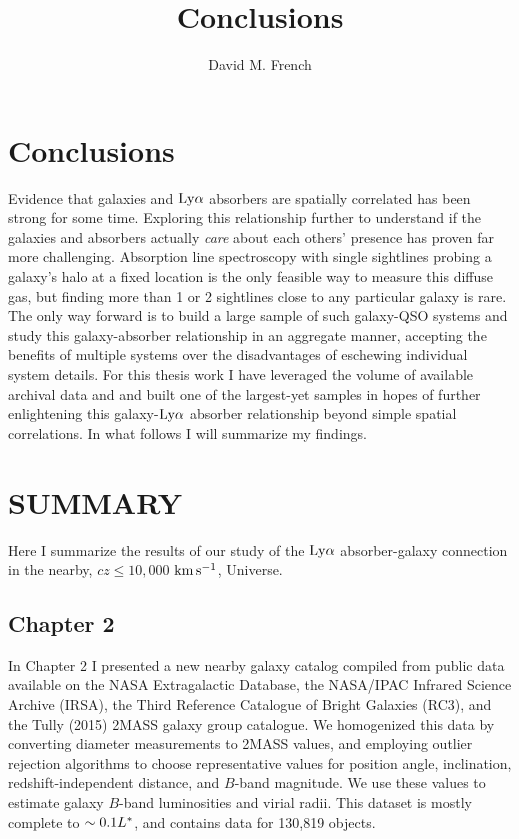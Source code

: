 \documentclass[twocolumn,tighten]{aastex62}
\newcommand{\kms}{$\rm km\, s^{-1}$}
\begin{document}
\title{Conclusions}



\author{David M. French}




\section{Conclusions}

Evidence that galaxies and $\rm Ly\alpha$ absorbers are spatially correlated has been strong for some time. Exploring this relationship further to understand if the galaxies and absorbers actually \emph{care} about each others' presence has proven far more challenging. Absorption line spectroscopy with single sightlines probing a galaxy's halo at a fixed location is the only feasible way to measure this diffuse gas, but finding more than 1 or 2 sightlines close to any particular galaxy is rare. The only way forward is to build a large sample of such galaxy-QSO systems and study this galaxy-absorber relationship in an aggregate manner, accepting the benefits of multiple systems over the disadvantages of eschewing individual system details. For this thesis work I have leveraged the volume of available archival data and and built one of the largest-yet samples in hopes of further enlightening this galaxy-$\rm Ly\alpha$ absorber relationship beyond simple spatial correlations. In what follows I will summarize my findings.

\section{SUMMARY}
Here I summarize the results of our study of the $\rm Ly\alpha$ absorber-galaxy connection in the nearby, $cz \leq 10,000$ \kms, Universe.

\subsection{Chapter 2}
In Chapter 2 I presented a new nearby galaxy catalog compiled from public data available on the NASA Extragalactic Database, the NASA/IPAC Infrared Science Archive (IRSA), the Third Reference Catalogue of Bright Galaxies (RC3), and the Tully (2015) 2MASS galaxy group catalogue. We homogenized this data by converting diameter measurements to 2MASS values, and employing outlier rejection algorithms to choose representative values for position angle, inclination, redshift-independent distance, and $B$-band magnitude. We use these values to estimate galaxy $B$-band luminosities and virial radii. This dataset is mostly complete to $\sim 0.1 L^{\**}$, and contains data for 130,819 objects.
\end{document}
